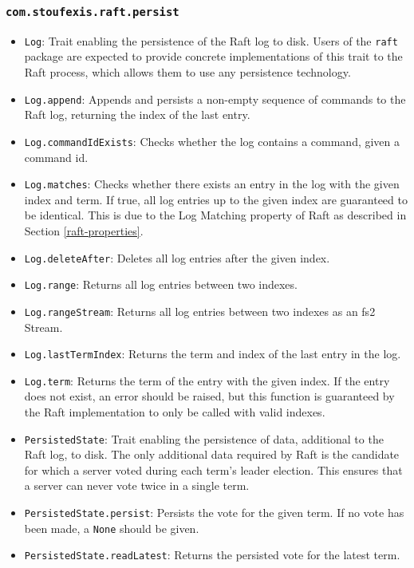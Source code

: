 \subsubsection{\lstinline|com.stoufexis.raft.persist|}

\begin{itemize}
    \item \lstinline|Log|: Trait enabling the persistence of the Raft log to disk. Users of the \lstinline|raft| package are expected to provide concrete implementations of this trait to the Raft process, which allows them to use any persistence technology.
    \item \lstinline|Log.append|: Appends and persists a non-empty sequence of commands to the Raft log, returning the index of the last entry.
    \item \lstinline|Log.commandIdExists|: Checks whether the log contains a command, given a command id.
    \item \lstinline|Log.matches|: Checks whether there exists an entry in the log with the given index and term. If true, all log entries up to the given index are guaranteed to be identical. This is due to the Log Matching property of Raft as described in Section \ref{raft-properties}.
    \item \lstinline|Log.deleteAfter|: Deletes all log entries after the given index.
    \item \lstinline|Log.range|: Returns all log entries between two indexes.
    \item \lstinline|Log.rangeStream|: Returns all log entries between two indexes as an fs2 Stream.
    \item \lstinline|Log.lastTermIndex|: Returns the term and index of the last entry in the log.
    \item \lstinline|Log.term|: Returns the term of the entry with the given index. If the entry does not exist, an error should be raised, but this function is guaranteed by the Raft implementation to only be called with valid indexes.
    \item \lstinline|PersistedState|: Trait enabling the persistence of data, additional to the Raft log, to disk. The only additional data required by Raft is the candidate for which a server voted during each term's leader election. This ensures that a server can never vote twice in a single term.
    \item \lstinline|PersistedState.persist|: Persists the vote for the given term. If no vote has been made, a \lstinline|None| should be given.
    \item \lstinline|PersistedState.readLatest|: Returns the persisted vote for the latest term.
\end{itemize}

